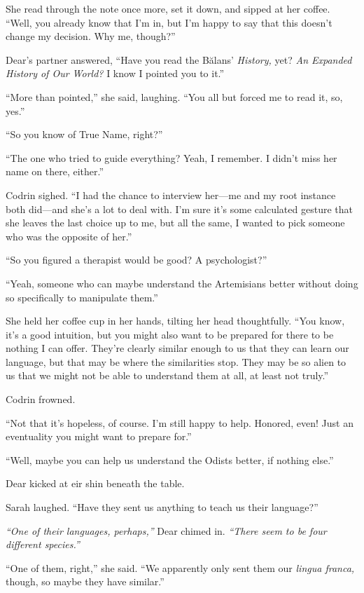 She read through the note once more, set it down, and sipped at her coffee. ``Well, you already know that I'm in, but I'm happy to say that this doesn't change my decision. Why me, though?''

Dear's partner answered, ``Have you read the Bălans' \emph{History,} yet? \emph{An Expanded History of Our World?} I know I pointed you to it.''

``More than pointed,'' she said, laughing. ``You all but forced me to read it, so, yes.''

``So you know of True Name, right?''

``The one who tried to guide everything? Yeah, I remember. I didn't miss her name on there, either.''

Codrin sighed. ``I had the chance to interview her—me and my root instance both did—and she's a lot to deal with. I'm sure it's some calculated gesture that she leaves the last choice up to me, but all the same, I wanted to pick someone who was the opposite of her.''

``So you figured a therapist would be good? A psychologist?''

``Yeah, someone who can maybe understand the Artemisians better without doing so specifically to manipulate them.''

She held her coffee cup in her hands, tilting her head thoughtfully. ``You know, it's a good intuition, but you might also want to be prepared for there to be nothing I can offer. They're clearly similar enough to us that they can learn our language, but that may be where the similarities stop. They may be so alien to us that we might not be able to understand them at all, at least not truly.''

Codrin frowned.

``Not that it's hopeless, of course. I'm still happy to help. Honored, even! Just an eventuality you might want to prepare for.''

``Well, maybe you can help us understand the Odists better, if nothing else.''

Dear kicked at eir shin beneath the table.

Sarah laughed. ``Have they sent us anything to teach us their language?''

\emph{``One of their languages, perhaps,''} Dear chimed in. \emph{``There seem to be four different species.''}

``One of them, right,'' she said. ``We apparently only sent them our \emph{lingua franca,} though, so maybe they have similar.''

